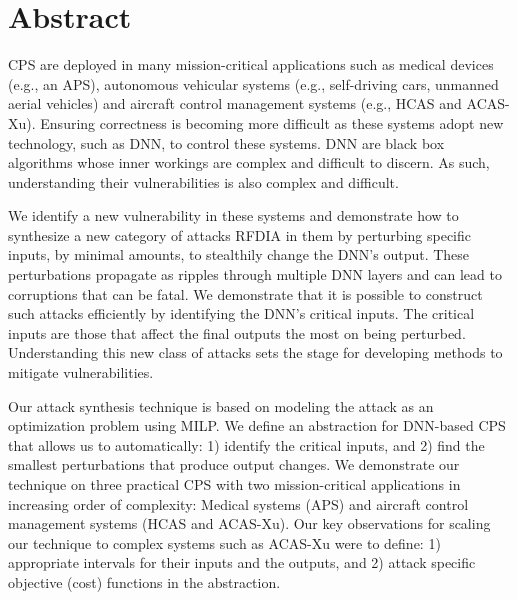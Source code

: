 
\chapter{Abstract}

\ac{CPS} are deployed in many mission-critical applications such as medical devices (e.g., an \ac{APS}), autonomous vehicular systems (e.g., self-driving cars, unmanned aerial vehicles) and aircraft control management systems (e.g.,  \ac{HCAS} and \ac{ACAS-Xu}). 
Ensuring correctness is becoming more difficult as these systems adopt new technology, such as \ac{DNN}, to control these systems. 
\ac{DNN} are black box algorithms whose inner workings are complex and difficult to discern.
As such, understanding their vulnerabilities is also complex and difficult. 

We identify a new vulnerability in these systems and demonstrate how to synthesize a new category of attacks \ac{RFDIA} in them by perturbing specific inputs, by minimal amounts, to stealthily change the \ac{DNN}'s output. 
 These  perturbations propagate as ripples through multiple \ac{DNN} layers and can lead to corruptions that can be fatal. 
We demonstrate that it is possible  to construct such attacks efficiently by identifying the \ac{DNN}'s critical inputs. 
The critical inputs are those that  affect the final outputs the most on being perturbed. 
Understanding this new class of attacks sets the stage for developing methods to mitigate vulnerabilities. 

Our attack synthesis technique is based on modeling the attack as an optimization problem using \ac{MILP}.
We define an abstraction for \ac{DNN}-based \ac{CPS} that allows us to automatically: 1) identify the critical inputs, and 2) find the smallest perturbations that produce output changes. 
We demonstrate our technique on three practical \ac{CPS} with two mission-critical applications in increasing order of complexity: Medical systems (\ac{APS}) and aircraft control management systems (\ac{HCAS} and \ac{ACAS-Xu}). 
Our key observations for scaling our technique to complex systems such as \ac{ACAS-Xu} were to define: 1) appropriate intervals for their inputs and the outputs, and 2) attack specific objective (cost) functions in the abstraction.  
 



